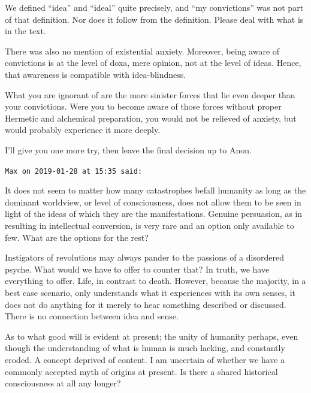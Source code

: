 \begin{footnotesize}
\begin{sffamily}
We defined ``idea'' and ``ideal'' quite precisely, and ``my convictions'' was not part of that definition. Nor does it follow from the definition. Please deal with what is in the text.

There was also no mention of existential anxiety. Moreover, being aware of convictions is at the level of doxa, mere opinion, not at the level of ideas. Hence, that awareness is compatible with idea-blindness.

What you are ignorant of are the more sinister forces that lie even deeper than your convictions. Were you to become aware of those forces without proper Hermetic and alchemical preparation, you would not be relieved of anxiety, but would probably experience it more deeply.

I'll give you one more try, then leave the final decision up to Anon.

\hfill

\texttt{Max on 2019-01-28 at 15:35 said:}

It does not seem to matter how many catastrophes befall humanity as long as the dominant worldview, or level of consciousness, does not allow them to be seen in light of the ideas of which they are the manifestations. Genuine persuasion, as in resulting in intellectual conversion, is very rare and an option only available to few. What are the options for the rest?

Instigators of revolutions may always pander to the passions of a disordered psyche. What would we have to offer to counter that? In truth, we have everything to offer. Life, in contrast to death. However, because the majority, in a best case scenario, only understands what it experiences with its own senses, it does not do anything for it merely to hear something described or discussed. There is no connection between idea and sense.

As to what good will is evident at present; the unity of humanity perhaps, even though the understanding of what is human is much lacking, and constantly eroded. A concept deprived of content. I am uncertain of whether we have a commonly accepted myth of origins at present. Is there a shared historical consciousness at all any longer?

\hfill

\end{sffamily}
\end{footnotesize}

